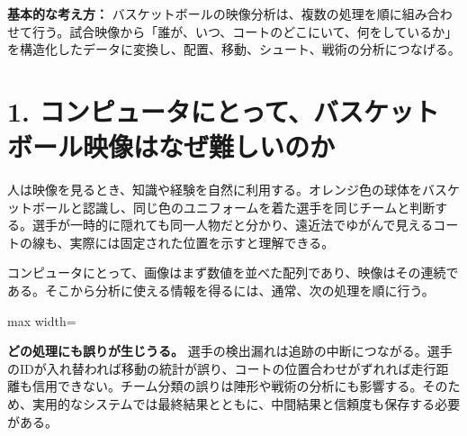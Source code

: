 \documentclass[11pt,a4paper,oneside]{report}
\begin{document}
\begin{heroBox}
\textbf{基本的な考え方：}\quad
バスケットボールの映像分析は、複数の処理を順に組み合わせて行う。試合映像から「誰が、いつ、コートのどこにいて、何をしているか」を構造化したデータに変換し、配置、移動、シュート、戦術の分析につなげる。
\end{heroBox}

\section*{1. コンピュータにとって、バスケットボール映像はなぜ難しいのか}

人は映像を見るとき、知識や経験を自然に利用する。オレンジ色の球体をバスケットボールと認識し、同じ色のユニフォームを着た選手を同じチームと判断する。選手が一時的に隠れても同一人物だと分かり、遠近法でゆがんで見えるコートの線も、実際には固定された位置を示すと理解できる。

コンピュータにとって、画像はまず数値を並べた配列であり、映像はその連続である。そこから分析に使える情報を得るには、通常、次の処理を順に行う。

\begin{center}
\begin{adjustbox}{max width=\linewidth}
\end{adjustbox}
\end{center}

\begin{plainBox}
\textbf{どの処理にも誤りが生じうる。}\quad
選手の検出漏れは追跡の中断につながる。選手のIDが入れ替われば移動の統計が誤り、コートの位置合わせがずれれば走行距離も信用できない。チーム分類の誤りは陣形や戦術の分析にも影響する。そのため、実用的なシステムでは最終結果とともに、中間結果と信頼度も保存する必要がある。
\end{plainBox}
\end{document}
